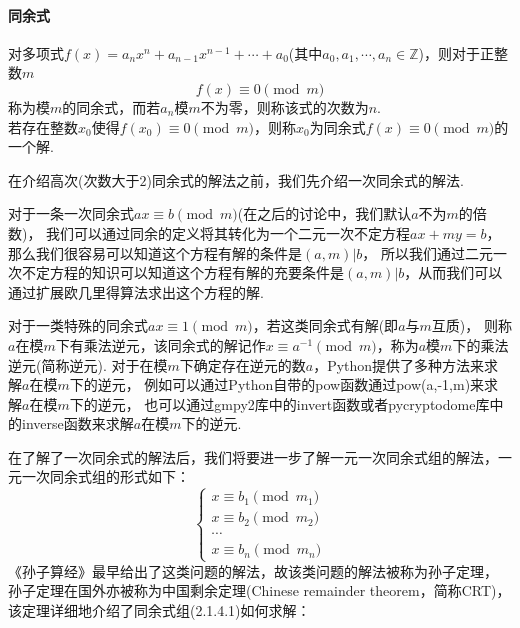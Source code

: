 \documentclass{book}
\numberwithin{equation}{subsubsection}
\begin{document}
\paragraph{\textbf{同余式}}
对多项式$f(x)=a_nx^n+a_{n-1}x^{n-1}+\cdots+a_0$(其中$a_0,a_1,\cdots,a_n\in\mathbb{Z}$)，则对于正整数$m$
\begin{equation}
    f(x)\equiv 0\pmod{m}
    \nonumber
\end{equation}
称为模$m$的同余式，而若$a_n$模$m$不为零，则称该式的次数为$n$.\\
若存在整数$x_0$使得$f(x_0)\equiv 0\pmod{m}$，则称$x_0$为同余式$f(x)\equiv 0\pmod{m}$的一个解.\par
在介绍高次(次数大于$2$)同余式的解法之前，我们先介绍一次同余式的解法.\par
对于一条一次同余式$ax\equiv b\pmod{m}$(在之后的讨论中，我们默认$a$不为$m$的倍数)，
我们可以通过同余的定义将其转化为一个二元一次不定方程$ax+my=b$，那么我们很容易可以知道这个方程有解的条件是$(a,m)|b$，
所以我们通过二元一次不定方程的知识可以知道这个方程有解的充要条件是$(a,m)|b$，从而我们可以通过扩展欧几里得算法求出这个方程的解.\par
对于一类特殊的同余式$ax\equiv 1\pmod{m}$，若这类同余式有解(即$a$与$m$互质)，
则称$a$在模$m$下有乘法逆元，该同余式的解记作$x\equiv a^{-1}\pmod{m}$，称为$a$模$m$下的乘法逆元(简称逆元).
对于在模$m$下确定存在逆元的数$a$，Python提供了多种方法来求解$a$在模$m$下的逆元，
例如可以通过Python自带的pow函数通过pow(a,-1,m)来求解$a$在模$m$下的逆元，
也可以通过gmpy2库中的invert函数或者pycryptodome库中的inverse函数来求解$a$在模$m$下的逆元.\par
在了解了一次同余式的解法后，我们将要进一步了解一元一次同余式组的解法，一元一次同余式组的形式如下：
\begin{equation}
    \begin{cases}
        x\equiv b_1\pmod{m_1}\\
        x\equiv b_2\pmod{m_2}\\
        \cdots\\
        x\equiv b_n\pmod{m_n}
    \end{cases}
\end{equation}
《孙子算经》最早给出了这类问题的解法，故该类问题的解法被称为孙子定理，
孙子定理在国外亦被称为中国剩余定理(Chinese remainder theorem，简称CRT)，
该定理详细地介绍了同余式组(2.1.4.1)如何求解：
\end{document}
